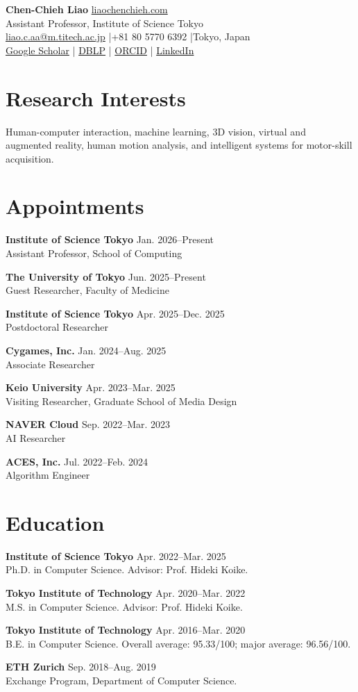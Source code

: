 \documentclass[10pt,a4paper]{article}
\newcommand{\cvitem}[3]{\textbf{#1} \hfill {\small #2}\\#3\par}
\begin{document}
{\Huge\sffamily\bfseries Chen-Chieh Liao}\hfill
\href{https://liaochenchieh.com}{liaochenchieh.com}\\[-1pt]
{\large\sffamily Assistant Professor, Institute of Science Tokyo}\\
\href{mailto:liao.c.aa@m.titech.ac.jp}{liao.c.aa@m.titech.ac.jp} \enspace|\enspace +81 80 5770 6392 \enspace|\enspace Tokyo, Japan\\[-2pt]
\href{https://scholar.google.com/citations?user=jYJJazcAAAAJ}{Google Scholar} \enspace|\enspace
\href{https://dblp.org/pid/16/8405.html}{DBLP} \enspace|\enspace
\href{https://orcid.org/0000-0002-9850-2468}{ORCID} \enspace|\enspace
\href{https://www.linkedin.com/in/chen-chieh-liao}{LinkedIn}

\section*{Research Interests}
Human-computer interaction, machine learning, 3D vision, virtual and augmented reality, human motion analysis, and intelligent systems for motor-skill acquisition.

\section*{Appointments}
\cvitem{Institute of Science Tokyo}{Jan. 2026--Present}{Assistant Professor, School of Computing}
\cvitem{The University of Tokyo}{Jun. 2025--Present}{Guest Researcher, Faculty of Medicine}
\cvitem{Institute of Science Tokyo}{Apr. 2025--Dec. 2025}{Postdoctoral Researcher}
\cvitem{Cygames, Inc.}{Jan. 2024--Aug. 2025}{Associate Researcher}
\cvitem{Keio University}{Apr. 2023--Mar. 2025}{Visiting Researcher, Graduate School of Media Design}
\cvitem{NAVER Cloud}{Sep. 2022--Mar. 2023}{AI Researcher}
\cvitem{ACES, Inc.}{Jul. 2022--Feb. 2024}{Algorithm Engineer}

\section*{Education}
\cvitem{Institute of Science Tokyo}{Apr. 2022--Mar. 2025}{Ph.D. in Computer Science. Advisor: Prof. Hideki Koike.}
\cvitem{Tokyo Institute of Technology}{Apr. 2020--Mar. 2022}{M.S. in Computer Science. Advisor: Prof. Hideki Koike.}
\cvitem{Tokyo Institute of Technology}{Apr. 2016--Mar. 2020}{B.E. in Computer Science. Overall average: 95.33/100; major average: 96.56/100.}
\cvitem{ETH Zurich}{Sep. 2018--Aug. 2019}{Exchange Program, Department of Computer Science.}
\end{document}
